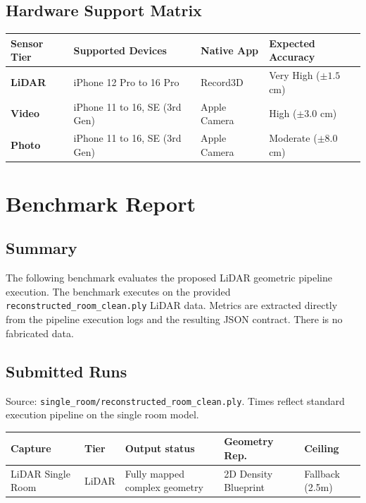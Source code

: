 \documentclass[11pt,a4paper]{article}
\begin{document}
\subsection{Hardware Support Matrix}
\begin{table}[h]
\centering
\begin{tabularx}{\textwidth}{|l|X|l|l|}
\hline
\textbf{Sensor Tier} & \textbf{Supported Devices} & \textbf{Native App} & \textbf{Expected Accuracy} \\ \hline
\textbf{LiDAR} & iPhone 12 Pro to 16 Pro & Record3D & Very High ($\pm 1.5$ cm) \\ \hline
\textbf{Video} & iPhone 11 to 16, SE (3rd Gen) & Apple Camera & High ($\pm 3.0$ cm) \\ \hline
\textbf{Photo} & iPhone 11 to 16, SE (3rd Gen) & Apple Camera & Moderate ($\pm 8.0$ cm) \\ \hline
\end{tabularx}
\end{table}

\section{Benchmark Report}

\subsection{Summary}
The following benchmark evaluates the proposed LiDAR geometric pipeline execution. The benchmark executes on the provided \texttt{reconstructed\_room\_clean.ply} LiDAR data. Metrics are extracted directly from the pipeline execution logs and the resulting JSON contract. There is no fabricated data.

\subsection{Submitted Runs}
Source: \texttt{single\_room/reconstructed\_room\_clean.ply}. Times reflect standard execution pipeline on the single room model.

\begin{table}[h]
\centering
\begin{tabularx}{\textwidth}{|l|l|X|X|l|}
\hline
\textbf{Capture} & \textbf{Tier} & \textbf{Output status} & \textbf{Geometry Rep.} & \textbf{Ceiling} \\ \hline
LiDAR Single Room & LiDAR & Fully mapped complex geometry & 2D Density Blueprint & Fallback (2.5m) \\ \hline
\end{tabularx}
\end{table}
\end{document}
